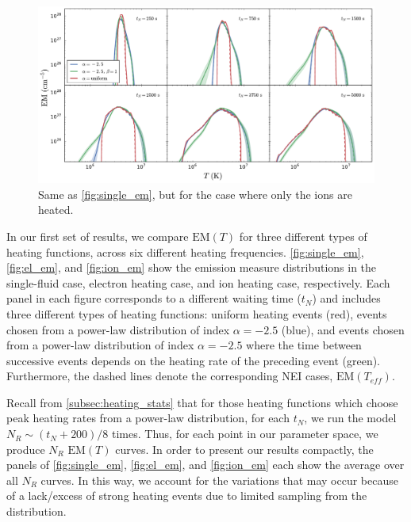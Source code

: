\documentclass[apj]{emulateapj}
\begin{document}
	\begin{figure}
		\centering
		\includegraphics[width=2\columnwidth]{figures/em_grid_ion_a25.pdf}
		\caption{Same as \autoref{fig:single_em}, but for the case where only the ions are heated.}
		\label{fig:ion_em}
	\end{figure}
	\par In our first set of results, we compare $\mathrm{EM}(T)$ for three different types of heating functions, across six different heating frequencies. \autoref{fig:single_em}, \autoref{fig:el_em}, and \autoref{fig:ion_em} show the emission measure distributions in the single-fluid case, electron heating case, and ion heating case, respectively. Each panel in each figure corresponds to a different waiting time ($t_N$) and includes three different types of heating functions: uniform heating events (red), events chosen from a power-law distribution of index $\alpha=-2.5$ (blue), and events chosen from a power-law distribution of index $\alpha=-2.5$ where the time between successive events depends on the heating rate of the preceding event (green). Furthermore, the dashed lines denote the corresponding NEI cases, $\mathrm{EM}(T_{eff})$.
	\par Recall from \autoref{subsec:heating_stats} that for those heating functions which choose peak heating rates from a power-law distribution, for each $t_N$, we run the model $N_R\sim(t_N+200)/8$ times. Thus, for each point in our parameter space, we produce $N_R$ $\mathrm{EM}(T)$ curves. In order to present our results compactly, the panels of \autoref{fig:single_em}, \autoref{fig:el_em}, and \autoref{fig:ion_em} each show the average over all $N_R$ curves. In this way, we account for the variations that may occur because of a lack/excess of strong heating events due to limited sampling from the distribution.
\end{document}

